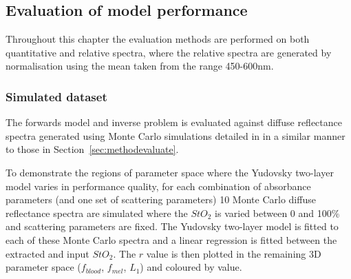 \subsection{Evaluation of model performance}\label{sec:methodevaluate2}
Throughout this chapter the evaluation methods are performed on both quantitative and relative spectra, where the relative spectra are generated by normalisation using the mean taken from the range 450-600nm.
\subsubsection{Simulated dataset}
The forwards model and inverse problem is evaluated against diffuse reflectance spectra generated using Monte Carlo simulations detailed in  in a similar manner to those in Section~\ref{sec:methodevaluate}. 
%


To demonstrate the regions of parameter space where the Yudovsky two-layer model varies in performance quality, for each combination of absorbance parameters (and one set of scattering parameters) 10 Monte Carlo diffuse reflectance spectra are simulated where the $StO_2$ is varied between 0 and 100\% and scattering parameters are fixed. The Yudovsky two-layer model is fitted to each of these Monte Carlo spectra and a linear regression is fitted between the extracted and input $StO_2$. The $r$ value is then plotted in the remaining 3D parameter space ($f_{blood}$, $f_{mel}$, $L_1$) and coloured by value.


